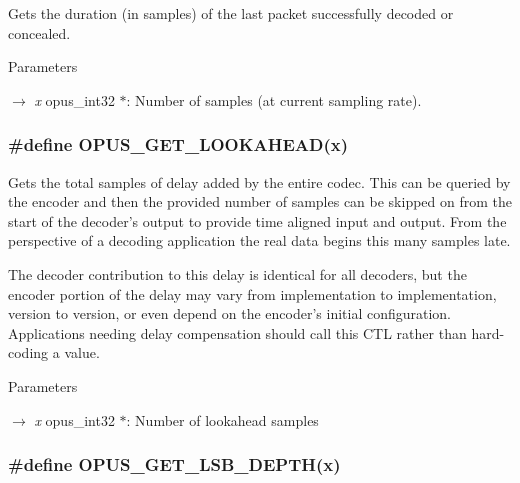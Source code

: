 Gets the duration (in samples) of the last packet successfully decoded or concealed. 
\begin{DoxyParams}{Parameters}
\item[\mbox{$\rightarrow$} {\em x}]{\ttfamily opus\_\-int32 $\ast$}: Number of samples (at current sampling rate). \end{DoxyParams}
\hypertarget{group__opus__encoderctls_gaf81b9e01501910adc67195ebb42b4a54}{
\subsubsection[{OPUS\_\-GET\_\-LOOKAHEAD}]{\setlength{\rightskip}{0pt plus 5cm}\#define OPUS\_\-GET\_\-LOOKAHEAD(x)}}
\label{group__opus__encoderctls_gaf81b9e01501910adc67195ebb42b4a54}


Gets the total samples of delay added by the entire codec. This can be queried by the encoder and then the provided number of samples can be skipped on from the start of the decoder's output to provide time aligned input and output. From the perspective of a decoding application the real data begins this many samples late.

The decoder contribution to this delay is identical for all decoders, but the encoder portion of the delay may vary from implementation to implementation, version to version, or even depend on the encoder's initial configuration. Applications needing delay compensation should call this CTL rather than hard-\/coding a value. 
\begin{DoxyParams}{Parameters}
\item[\mbox{$\rightarrow$} {\em x}]{\ttfamily opus\_\-int32 $\ast$}: Number of lookahead samples \end{DoxyParams}
\hypertarget{group__opus__encoderctls_gab5ecdfbbbabfaefc2f2ca79cf4a3b08f}{
\subsubsection[{OPUS\_\-GET\_\-LSB\_\-DEPTH}]{\setlength{\rightskip}{0pt plus 5cm}\#define OPUS\_\-GET\_\-LSB\_\-DEPTH(x)}}
\label{group__opus__encoderctls_gab5ecdfbbbabfaefc2f2ca79cf4a3b08f}


